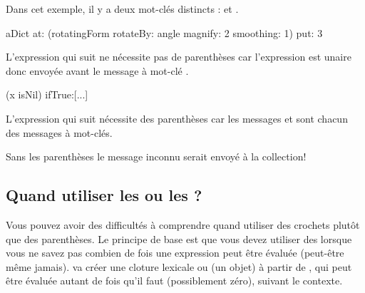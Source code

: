 \documentclass[a4paper,10pt,twoside]{book}
\begin{document}
Dans cet exemple, il y a deux mot-cl\'es distincts :  et .

\begin{code}{}
aDict
   at: (rotatingForm 
          rotateBy: angle	
          magnify: 2 
          smoothing: 1)
   put: 3
\end{code}




L'expression qui suit ne n\'ecessite pas de parenth\`eses car l'expression  est unaire donc envoy\'ee avant le message \`a mot-cl\'e \mbox{.}
\begin{code}{}
(x isNil)
   ifTrue:[...]
\end{code}

L'expression qui suit n\'ecessite des parenth\`eses car les messages  et  sont chacun des messages \`a mot-cl\'es. 

\noindent
Sans les parenth\`eses le message inconnu  serait envoy\'e \`a la collection!

\subsection{Quand utiliser les \lct{[ ]} ou les \lct{( )} ?}

Vous pouvez avoir des difficult\'es \`a comprendre quand utiliser des crochets plut\^ot que des parenth\`eses.
Le principe de base est que vous devez utiliser des \ct{[ ]} lorsque vous ne savez pas combien de fois une expression peut \^etre \'evalu\'ee (peut-\^etre m\^eme jamais).
 va cr\'eer une cloture lexicale ou  (\ie un objet) \`a partir de , qui peut \^etre \'evalu\'ee autant de fois qu'il faut (possiblement z\'ero), suivant le contexte.
\end{document}
